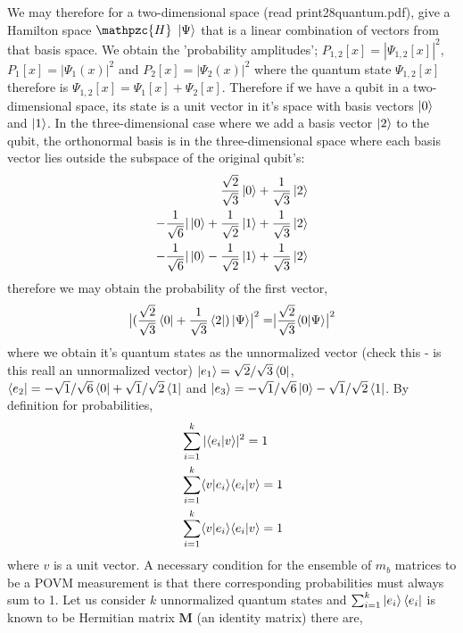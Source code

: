 \documentclass[7pt]{article}
\begin{document}
We may therefore for a two-dimensional space (read print28quantum.pdf), give a Hamilton space $\mathpzc{H}$ $\ket{\Psi}$ that is a linear combination of vectors from that basis space. We  obtain the 'probability amplitudes'; $P_{1,2}[x]= |\Psi_{1,2}[x]|^2$, $P_{1}[x] = |\Psi_{1}(x)|^2$ and $P_{2}[x] = |\Psi_{2}(x)|^2$ where the quantum state $\Psi_{1,2}[x]$ therefore is $\Psi_{1,2}[x] =  \Psi_{1}[x] + \Psi_{2}[x]$. Therefore if we have a qubit in a two-dimensional space, its state is a unit vector in it's space with basis vectors $\ket{0}$ and $\ket{ 1}$. In the three-dimensional case where we add a basis vector $\ket{2}$ to the qubit, the orthonormal basis is in the three-dimensional space where each basis vector lies outside the subspace of the original qubit's:
\begin{equation}
\begin{split}
\dfrac{\sqrt{2}}{\sqrt{3}}\ket{0} + \dfrac{1}{\sqrt{3}}\ket{2} & \\
-\dfrac{1}{\sqrt{6}}|\ket{0} + \dfrac{1}{\sqrt{2}}\ket{1} + \dfrac{1}{\sqrt{3}}\ket{2} & \\
-\dfrac{1}{\sqrt{6}}|\ket{0} - \dfrac{1}{\sqrt{2}}\ket{1} + \dfrac{1}{\sqrt{3}}\ket{2} &
\end{split}
\end{equation}
therefore we may obtain the probability of the first vector,
$$
\bigr|(\dfrac{\sqrt{2}}{\sqrt{3}}\bra{0} + \dfrac{1}{\sqrt{3}}\bra{2})\ket{\Psi}\bigr|^2 = \bigr|\dfrac{\sqrt{2}}{\sqrt{3}}\inn{0|\Psi} \bigr|^2
$$
where we obtain it's quantum states as the unnormalized vector (check this - is this reall an unnormalized vector)  $\ket{e_1} = \sqrt{2}/\sqrt{3} \bra{0}$, $\bra{e_2} = - \sqrt{1}/\sqrt{6} \bra{0} + \sqrt{1}/\sqrt{2} \bra{1}$ and $\ket{e_3} = - \sqrt{1}/\sqrt{6} \ket{0} - \sqrt{1}/\sqrt{2} \bra{1}$. By definition for probabilities,
\begin{equation}
\begin{split}
& \sum_{i=1}^k |\inn{e_i|v}|^2 = 1 \\
& \sum_{i=1}^k \inn{v|e_i}\inn{e_i|v}  = 1 \\
& \sum_{i=1}^k \inn{v|e_i}\inn{e_i|v}  = 1 \\
\end{split}
\end{equation}
where $v$ is a unit vector. A necessary condition for the ensemble of $m_b$ matrices to be a POVM measurement is that there corresponding probabilities must always sum to 1. Let us consider $k$ unnormalized quantum states and $\sum_{i=1}^k \ket{e_i}\bra{e_i}$ is known to be Hermitian matrix $\mathbf{M}$ (an identity matrix) there are,
\end{document}
